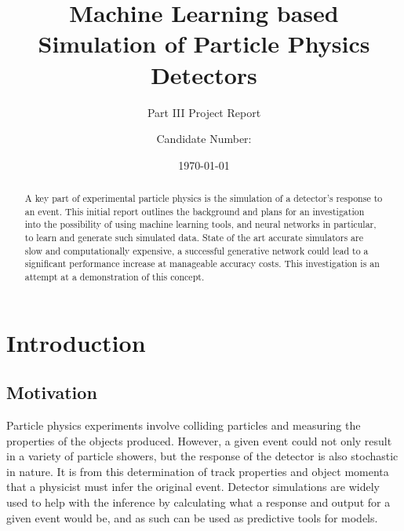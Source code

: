 \documentclass{report}
\title{Machine Learning based Simulation of Particle Physics Detectors}
\subtitle{Part III Project Report}
\author{Candidate Number: }
\date{\today}
\begin{document}
\begin{titlepage}
\maketitle


%
%
%

\end{titlepage}

\begin{abstract}
A key part of experimental particle physics is the simulation of a detector's response to an event. This initial report outlines the background and plans for an investigation into the possibility of using machine learning tools, and neural networks in particular, to learn and generate such simulated data. State of the art accurate simulators are slow and computationally expensive, a successful generative network could lead to a significant performance increase at manageable accuracy costs. This investigation is an attempt at a demonstration of this concept.
\end{abstract}

\chapter{Introduction}

\section{Motivation}
Particle physics experiments involve colliding particles and measuring the properties of the objects produced. However, a given event could not only result in a variety of particle showers, but the response of the detector is also stochastic in nature. It is from this determination of track properties and object momenta that a physicist must infer the original event. Detector simulations are widely used to help with the inference by calculating what a response and output for a given event would be, and as such can be used as predictive tools for models.\\
\end{document}
